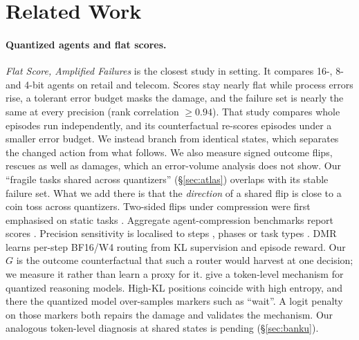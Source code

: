\section{Related Work}
\label{sec:related}

\paragraph{Quantized agents and flat scores.} \emph{Flat Score, Amplified Failures} \citep{jang2026flat} is the closest study in setting. It compares 16-, 8- and 4-bit agents on \tautwo{} retail and telecom. Scores stay nearly flat while process errors rise, a tolerant error budget masks the damage, and the failure set is nearly the same at every precision (rank correlation $\ge 0.94$). %
That study compares whole episodes run independently, and its counterfactual re-scores episodes under a smaller error budget. We instead branch from identical states, which separates the changed action from what follows. We also measure signed outcome flips, rescues as well as damages, which an error-volume analysis does not show. Our ``fragile tasks shared across quantizers'' (\S\ref{sec:atlas}) overlaps with its stable failure set. What we add there is that the \emph{direction} of a shared flip is close to a coin toss across quantizers. Two-sided flips under compression were first emphasised on static tasks \citep{dutta2024accuracy}. Aggregate agent-compression benchmarks report scores \citep{dong2025acbench}. Precision sensitivity is localised to steps \citep{li2026dynamicmp}, phases \citep{lu2026mixquant} or task types \citep{zhang2026quantclaw}. DMR \citep{li2026dynamicmp} learns per-step BF16/W4 routing from KL supervision and episode reward. Our $G$ is the outcome counterfactual that such a router would harvest at one decision; we measure it rather than learn a proxy for it. \citet{lotfi2026quantized} give a token-level mechanism for quantized reasoning models. High-KL positions coincide with high entropy, and there the quantized model over-samples markers such as ``wait''. A logit penalty on those markers both repairs the damage and validates the mechanism. Our analogous token-level diagnosis at shared states is pending (\S\ref{sec:banku}).

